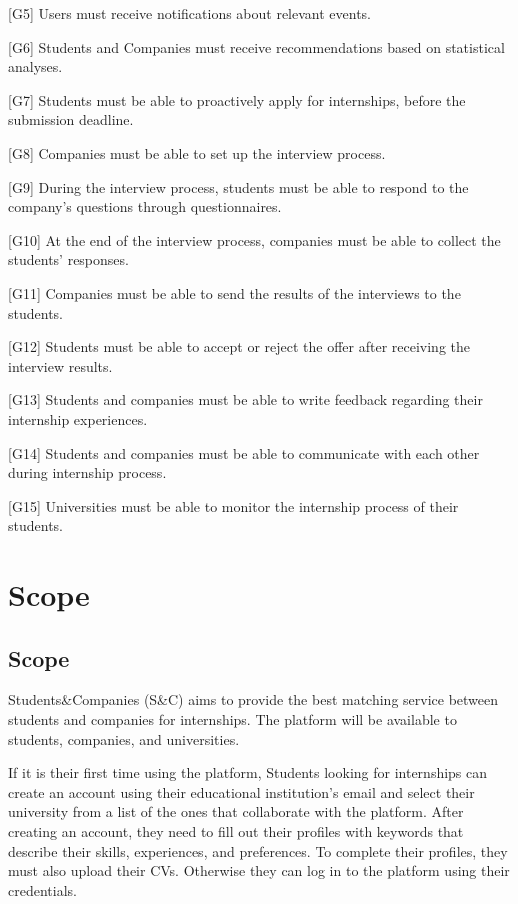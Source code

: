 [G5] Users must receive notifications about relevant events.

[G6] Students and Companies must receive recommendations based on statistical analyses.

[G7] Students must be able to proactively apply for internships, before the submission deadline.

[G8] Companies must be able to set up the interview process.

[G9] During the interview process, students must be able to respond to the company's questions through questionnaires.

[G10] At the end of the interview process, companies must be able to collect the students' responses.

[G11] Companies must be able to send the results of the interviews to the students.

[G12] Students must be able to accept or reject the offer after receiving the interview results.

[G13] Students and companies must be able to write feedback regarding their internship experiences.

[G14] Students and companies must be able to communicate with each other during internship process.

[G15] Universities must be able to monitor the internship process of their students.


\newpage
\section{Scope}\label{sec:scope}
\subsection{Scope}\label{subsec:scope}
Students\&Companies (S\&C) aims to provide the best matching service between students and companies for internships. The platform will be available
to students, companies, and universities.

If it is their first time using the platform, Students looking for internships can create an account using their educational institution's email and 
select their university from a list of the ones that collaborate with the platform. 
After creating an account, they need to fill out their profiles with keywords that describe their skills, experiences, and preferences. To complete
their profiles, they must also upload their CVs.
Otherwise they can log in to the platform using their credentials.

